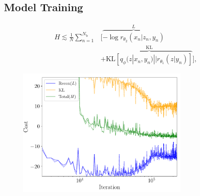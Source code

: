 \documentclass[aps,superscriptaddress,twocolumn,nopreprintnumbers,floatfix,groupedaddress]{revtex4-1}
\newcommand{\figwidth}{8.6cm}
\begin{document}
\subsection{Model Training}
%
\begin{align}\label{eq:cost_approx} H \lesssim
\frac{1}{N}\sum_{n=1}^{N_{\text{b}}}&\Big[\overbrace{-\log
	r_{\theta_{2}}(x_{n}|z_{n},y_{n})}^{L}\nonumber\\
&+\overbrace{\text{KL}\left[q_{\phi}(z|x_{n},y_{n})||r_{\theta_{1}}(z|y_{n})\right]}^{\text{KL}}\Big],
\end{align}
%
%
\begin{figure}
	\centering
	\includegraphics[width=\figwidth]{figs/cost.pdf}
	\caption{}
	\label{fig:learning_contours}
\end{figure}
\end{document}
